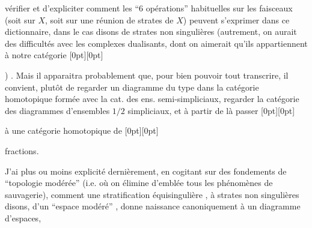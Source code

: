 %
vérifier et d'expliciter comment les ``6 opérations'' habituelles sur les faisceaux (soit sur $X$, soit sur une réunion de strates de $X$) peuvent s'exprimer dans ce dictionnaire, dans le cas disons de strates non singulières (autrement, on aurait des difficultés avec les complexes dualisants, dont on aimerait qu'ils appartiennent à notre catégorie%
\raisebox{0pt}[0pt][0pt]{\parbox{0pt}{}}%
) . Mais il apparaitra probablement que, pour bien pouvoir tout transcrire, il convient, plutôt  de regarder un diagramme du type
dans la catégorie homotopique formée avec la cat. des ens. semi-simpliciaux,  regarder la catégorie des diagrammes d'ensembles $1/2$ simpliciaux, et à partir de là passer%
\raisebox{0pt}[0pt][0pt]{\parbox{0pt}{}} à une catégorie homotopique de %
\raisebox{0pt}[0pt][0pt]{\parbox{0pt}{}}fractions.

J'ai plus ou moins explicité dernièrement, en cogitant sur des fondements de ``topologie modérée'' (i.e. où on élimine d'emblée tous les phénomènes de sauvagerie), comment une stratification équisingulière%
, à strates non singulières disons, d'un ``espace modéré'' , donne naissance canoniquement à un diagramme  d'espaces,
